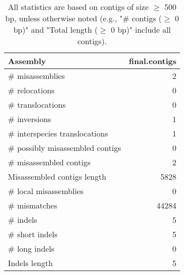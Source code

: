 \documentclass[12pt,a4paper]{article}
\begin{document}
\begin{table}[ht]
\begin{center}
\caption{All statistics are based on contigs of size $\geq$ 500 bp, unless otherwise noted (e.g., "\# contigs ($\geq$ 0 bp)" and "Total length ($\geq$ 0 bp)" include all contigs).}
\begin{tabular}{|l*{1}{|r}|}
\hline
Assembly & final.contigs \\ \hline
\# misassemblies & 2 \\ \hline
\hspace{5mm}\# relocations & 0 \\ \hline
\hspace{5mm}\# translocations & 0 \\ \hline
\hspace{5mm}\# inversions & 1 \\ \hline
\hspace{5mm}\# interspecies translocations & 1 \\ \hline
\# possibly misassembled contigs & 0 \\ \hline
\# misassembled contigs & 2 \\ \hline
Misassembled contigs length & 5828 \\ \hline
\# local misassemblies & 0 \\ \hline
\# mismatches & 44284 \\ \hline
\# indels & 5 \\ \hline
\hspace{5mm}\# short indels & 5 \\ \hline
\hspace{5mm}\# long indels & 0 \\ \hline
Indels length & 5 \\ \hline
\end{tabular}
\end{center}
\end{table}
\end{document}
